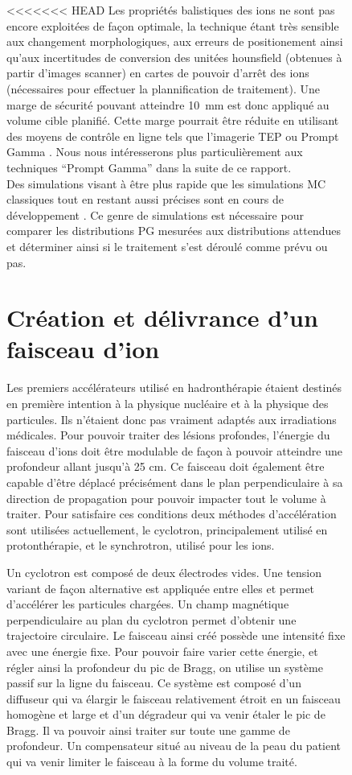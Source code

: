 \documentclass[11pt,a4paper,oldfontcommands]{memoir}
\begin{document}
\begin{figure}
<<<<<<< HEAD
Les propriétés balistiques des ions ne sont pas encore exploitées de façon optimale, la technique étant très sensible aux changement morphologiques, aux erreurs de positionement ainsi qu'aux incertitudes de conversion des unitées hounsfield (obtenues à partir d'images scanner) en cartes de pouvoir d'arrêt des ions (nécessaires pour effectuer la plannification de traitement)\cite{Paganetti2012}. Une marge de sécurité pouvant atteindre 10~mm est donc appliqué au volume cible planifié. Cette marge pourrait être réduite en utilisant des moyens de contrôle en ligne tels que l'imagerie TEP \cite{Parodi20157153} ou Prompt Gamma \cite{PGMonitoringC12}. Nous nous intéresserons plus particulièrement aux techniques \enquote{Prompt Gamma} dans la suite de ce rapport. \\
Des simulations visant à être plus rapide que les simulations MC classiques tout en restant aussi précises sont en cours de développement \cite{Huisman_2016}\cite{Embriaco_2018}\cite{Sterpin_2015}. Ce genre de simulations est nécessaire pour comparer les distributions PG mesurées aux distributions attendues et déterminer ainsi si le traitement s'est déroulé comme prévu ou pas.

\section{Création et délivrance d'un faisceau d'ion}
Les premiers accélérateurs utilisé en hadronthérapie étaient destinés en première intention à la physique nucléaire et à la physique des particules. Ils n'étaient donc pas vraiment adaptés aux irradiations médicales. Pour pouvoir traiter des lésions profondes, l'énergie du faisceau d'ions doit être modulable de façon à pouvoir atteindre une profondeur allant jusqu'à 25 cm. Ce faisceau doit également être capable d'être déplacé précisément dans le plan perpendiculaire à sa direction de propagation pour pouvoir impacter tout le volume à traiter. Pour satisfaire ces conditions deux méthodes d'accélération sont utilisées actuellement, le cyclotron, principalement utilisé en protonthérapie, et le synchrotron, utilisé pour les ions.

Un cyclotron est composé de deux électrodes vides. Une tension variant de façon alternative est appliquée entre elles et permet d'accélérer les particules chargées. Un champ magnétique perpendiculaire au plan du cyclotron permet d'obtenir une trajectoire circulaire. Le faisceau ainsi créé possède une intensité fixe avec une énergie fixe. Pour pouvoir faire varier cette énergie, et régler ainsi la profondeur du pic de Bragg, on utilise un système passif sur la ligne du faisceau. Ce système est composé d'un diffuseur qui va élargir le faisceau relativement étroit en un faisceau homogène et large et d'un dégradeur qui va venir étaler le pic de Bragg. Il va pouvoir ainsi traiter sur toute une gamme de profondeur. Un compensateur situé au niveau de la peau du patient qui va venir limiter le faisceau à la forme du volume traité.


\end{figure}
\end{document}
